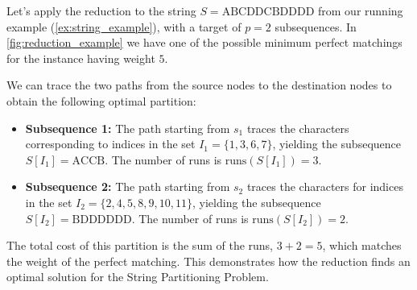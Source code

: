 \begin{example} \label{ex:reduction_ex}
    Let's apply the reduction to the string $S = \text{ABCDDCBDDDD}$ from our running example (\cref{ex:string_example}), with a target of $p=2$ subsequences. In \cref{fig:reduction_example} we have one of the possible minimum perfect matchings for the instance having weight $5$. 
    
    We can trace the two paths from the source nodes to the destination nodes to obtain the following optimal partition:
    \begin{itemize}
        \item \textbf{Subsequence 1:} The path starting from $s_1$ traces the characters corresponding to indices in the set $I_1 = \{1, 3, 6, 7\}$, yielding the subsequence $S[I_1] = \text{ACCB}$. The number of runs is $\text{runs}(S[I_1]) = 3$.
        \item \textbf{Subsequence 2:} The path starting from $s_2$ traces the characters for indices in the set $I_2 = \{2, 4, 5, 8, 9, 10, 11\}$, yielding the subsequence $S[I_2] = \text{BDDDDDD}$. The number of runs is $\text{runs}(S[I_2]) = 2$.
    \end{itemize}
    The total cost of this partition is the sum of the runs, $3 + 2 = 5$, which matches the weight of the perfect matching. This demonstrates how the reduction finds an optimal solution for the String Partitioning Problem.

    \begin{figure}[H]
        \centering
\end{figure}
\end{example}

